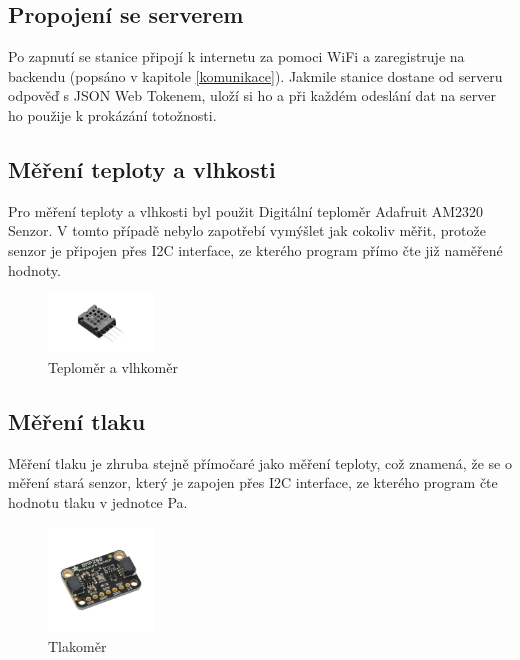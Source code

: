 \newpage

\subsection{Propojení se serverem}
Po zapnutí se stanice připojí k internetu za pomoci WiFi a zaregistruje na backendu (popsáno v kapitole \ref{komunikace}). Jakmile stanice dostane od serveru odpověď s 
JSON Web Tokenem, uloží si ho a při každém odeslání dat na server ho použije k prokázání totožnosti.
\subsection{Měření teploty a vlhkosti}
Pro měření teploty a vlhkosti byl použit Digitální teploměr Adafruit AM2320 Senzor\cite{teplomer}. V tomto případě nebylo zapotřebí vymýšlet jak cokoliv měřit,
protože senzor je připojen přes I2C interface, ze kterého program přímo čte již naměřené hodnoty.
\begin{figure}[h] 
    \centering
    \includegraphics[width=0.25\textwidth]{images/Adafruit-AM2320.jpg}
    \caption{Teploměr a vlhkoměr}
\end{figure}

\subsection{Měření tlaku}
Měření tlaku je zhruba stejně přímočaré jako měření teploty, což znamená, že se o měření stará senzor\cite{tlakoměr},
který je zapojen přes I2C interface, ze kterého program čte hodnotu tlaku v jednotce Pa.

\begin{figure}[h] 
    \centering
    \includegraphics[width=0.25\textwidth]{images/Adafruit-BMP280.jpg}
    \caption{Tlakoměr}
\end{figure}
